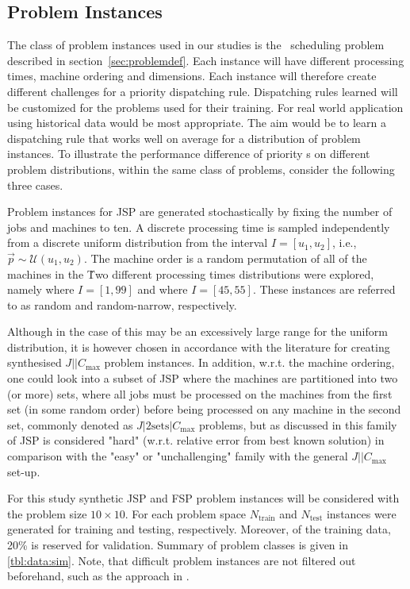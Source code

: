 \documentclass[smallextended]{svjour3}
\begin{document}
\subsection*{Problem Instances}\label{sec:data:sim}

The class of problem instances used in our studies is the \jsp\ scheduling 
problem described in section~\ref{sec:problemdef}. Each instance will have 
different processing times, machine ordering and dimensions. Each instance will 
therefore create different challenges for a priority dispatching rule. 
Dispatching rules learned will be customized for the problems used for their 
training. For real world application using historical data would be most 
appropriate. The aim would be to learn a dispatching rule that works well on 
average for a distribution of problem instances. To illustrate the performance 
difference of priority \dr s on different problem distributions, 
within the same class of problems, consider the following three cases.

Problem instances for JSP are generated stochastically by fixing the number of 
jobs and machines to ten. A discrete processing time is sampled independently 
from a discrete uniform distribution from the interval $I=[u_1,u_2]$, i.e., 
$\vec{p}\sim \mathcal{U}(u_1,u_2)$. 
The machine order is a random permutation of all of the machines in the 
\jsp\. Two different processing times distributions were explored, namely 
where $I=[1,99]$ and  where $I=[45,55]$. These instances 
are referred to as random and random-narrow, respectively. 

Although in the case of   this may be an excessively large range for 
the uniform distribution, it is however chosen in accordance with the 
literature \cite{Demirkol98} for creating synthesised $J||C_{\max}$ problem 
instances. In addition, w.r.t. the machine ordering, one could look into a 
subset of JSP where the machines are partitioned into two (or more) sets, where 
all jobs must be processed on the machines from the first set (in some random 
order) before being processed on any machine in the second set, commonly 
denoted as $J|2\textrm{sets}|C_{\max}$ problems, but as discussed in 
\cite{orlib_swv} this family of JSP is considered "hard" (w.r.t. relative error 
from best known solution) in comparison with the "easy" or "unchallenging" 
family with the general $J||C_{\max}$ set-up. %


For this study synthetic JSP and FSP problem instances will be considered with 
the problem size $10\times10$. 
For each problem space $N_{\text{train}}$  and $N_{\text{test}}$ instances were 
generated for training and testing, respectively. Moreover, of the training 
data, 20\% is reserved for validation.
Summary of problem classes is given in \cref{tbl:data:sim}.  
Note, that difficult problem instances are not filtered out beforehand, such as 
the approach in \cite{Whitley}. 
\end{document}
